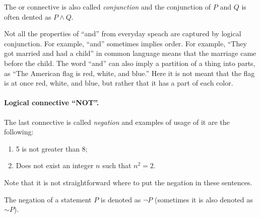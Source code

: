 The or connective is also called \emph{conjunction} and the conjunction of
$P$ and $Q$ is often dented as $P \land Q$.


\begin{warning}
  Not all the properties of ``and'' from everyday speach are captured by
  logical conjunction. For example, ``and'' sometimes implies order. For
  example, ``They got married and had a child'' in common language means that
  the marriage came before the child. The word ``and'' can also imply a
  partition of a thing into parts, as ``The American flag is red, white, and
  blue.'' Here it is not meant that the flag is at once red, white, and blue,
  but rather that it has a part of each color.
\end{warning}

\paragraph{Logical connective ``NOT''.}
The last connective is called \emph{negation} and examples of usage of it are
the following:
\begin{enumerate}
  \item 5 is not greater than 8;
  \item Does not exist an integer $n$ such that $n^2 = 2$.
\end{enumerate}

Note that it is not straightforward where to put the negation in these
sentences.

The negation of a statement $P$ is denoted as $\lnot P$ (sometimes it is also
denoted as $\sim P$).



